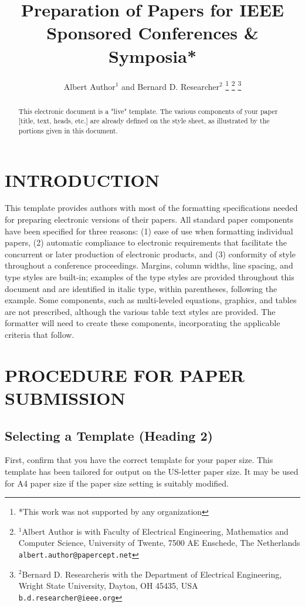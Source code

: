 \documentclass[letterpaper, 10 pt, conference]{ieeeconf}  %
\title{\LARGE \bf
Preparation of Papers for IEEE Sponsored Conferences \& Symposia*
}
\author{Albert Author$^{1}$ and Bernard D. Researcher$^{2}$%
\thanks{*This work was not supported by any organization}%
\thanks{$^{1}$Albert Author is with Faculty of Electrical Engineering, Mathematics and Computer Science,
        University of Twente, 7500 AE Enschede, The Netherlands
        {\tt\small albert.author@papercept.net}}%
\thanks{$^{2}$Bernard D. Researcheris with the Department of Electrical Engineering, Wright State University,
        Dayton, OH 45435, USA
        {\tt\small b.d.researcher@ieee.org}}%
}
\begin{document}
\maketitle
\thispagestyle{empty}
\pagestyle{empty}


\begin{abstract}

This electronic document is a "live" template. The various components of your paper [title, text, heads, etc.] are already defined on the style sheet, as illustrated by the portions given in this document.

\end{abstract}


\section{INTRODUCTION}

This template provides authors with most of the formatting specifications needed for preparing electronic versions of their papers. All standard paper components have been specified for three reasons: (1) ease of use when formatting individual papers, (2) automatic compliance to electronic requirements that facilitate the concurrent or later production of electronic products, and (3) conformity of style throughout a conference proceedings. Margins, column widths, line spacing, and type styles are built-in; examples of the type styles are provided throughout this document and are identified in italic type, within parentheses, following the example. Some components, such as multi-leveled equations, graphics, and tables are not prescribed, although the various table text styles are provided. The formatter will need to create these components, incorporating the applicable criteria that follow.

\section{PROCEDURE FOR PAPER SUBMISSION}

\subsection{Selecting a Template (Heading 2)}

First, confirm that you have the correct template for your paper size. This template has been tailored for output on the US-letter paper size. 
It may be used for A4 paper size if the paper size setting is suitably modified.
\end{document}
